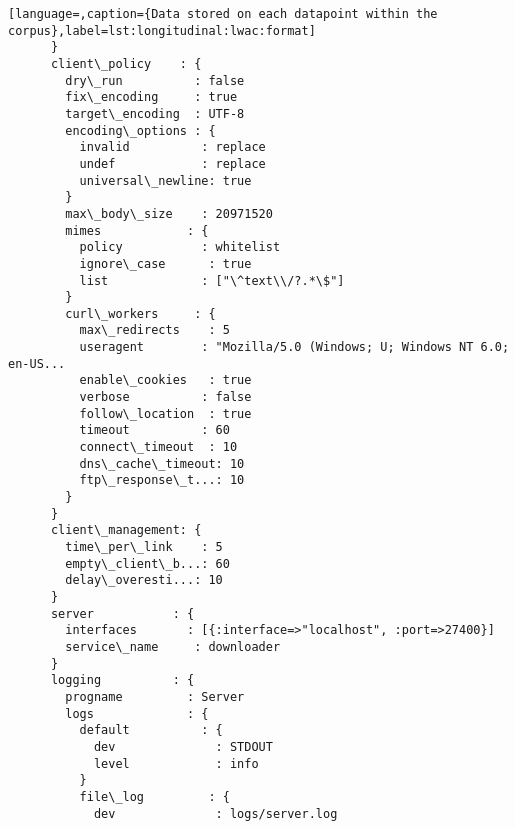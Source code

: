 \begin{lstlisting}[language=,caption={Data stored on each datapoint within the corpus},label=lst:longitudinal:lwac:format]
      }
      client\_policy    : {
        dry\_run          : false                                             
        fix\_encoding     : true                                              
        target\_encoding  : UTF-8                                             
        encoding\_options : {
          invalid          : replace                                           
          undef            : replace                                           
          universal\_newline: true                                              
        }
        max\_body\_size    : 20971520                                          
        mimes            : {
          policy           : whitelist                                         
          ignore\_case      : true                                              
          list             : ["\^text\\/?.*\$"]                                  
        }
        curl\_workers     : {
          max\_redirects    : 5                                                 
          useragent        : "Mozilla/5.0 (Windows; U; Windows NT 6.0; en-US...
          enable\_cookies   : true                                              
          verbose          : false                                             
          follow\_location  : true                                              
          timeout          : 60                                                
          connect\_timeout  : 10                                                
          dns\_cache\_timeout: 10                                                
          ftp\_response\_t...: 10                                                
        }
      }
      client\_management: {
        time\_per\_link    : 5                                                 
        empty\_client\_b...: 60                                                
        delay\_overesti...: 10                                                
      }
      server           : {
        interfaces       : [{:interface=>"localhost", :port=>27400}]         
        service\_name     : downloader                                        
      }
      logging          : {
        progname         : Server                                            
        logs             : {
          default          : {
            dev              : STDOUT                                            
            level            : info                                              
          }
          file\_log         : {
            dev              : logs/server.log                                   

\end{lstlisting}
